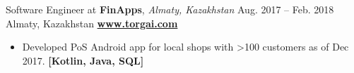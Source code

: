 \cveventflat
{Software Engineer at }
{\textbf{FinApps}, \textit{Almaty, Kazakhstan}}
{Aug. 2017 -- Feb. 2018}
{Almaty, Kazakhstan}
\newline
\href{https://torgai.com/}{\textbf{www.torgai.com}}
\begin{itemize}
    \item Developed PoS Android app for local shops with >100 customers as of Dec 2017.
    \textbf{[Kotlin, Java, SQL]}
\end{itemize}
